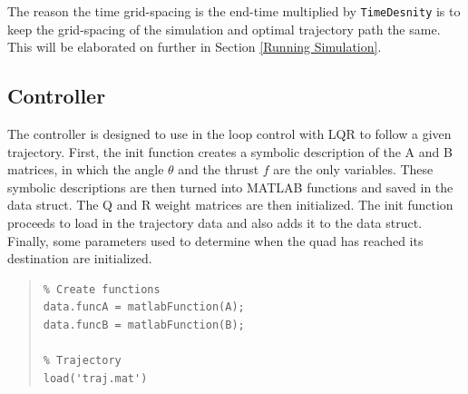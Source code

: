\documentclass[12pt]{article}
\begin{document}
The reason the time grid-spacing is the end-time multiplied by \lstinline!TimeDesnity! is to keep the grid-spacing of the simulation and optimal trajectory path the same. This will be elaborated on further in Section \ref{Running Simulation}.

\subsection{Controller}
The controller is designed to use in the loop control with LQR to follow a given trajectory. First, the init function creates a symbolic description of the A and B matrices, in which the angle $\theta$ and the thrust $f$ are the only variables.  These symbolic descriptions are then turned into MATLAB functions and saved in the data struct.  The Q and R weight matrices are then initialized.  The init function proceeds to load in the trajectory data and also adds it to the data struct.  Finally, some parameters used to determine when the quad has reached its destination are initialized.
\begin{quote}
\begin{lstlisting}
% Create functions
data.funcA = matlabFunction(A);
data.funcB = matlabFunction(B);

% Trajectory
load('traj.mat')
\end{lstlisting}
\end{quote}
\end{document}
